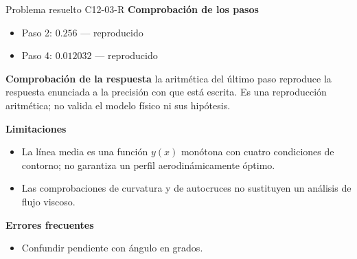 \documentclass[10pt,openany]{book}
\begin{document}
\begin{studiumworked}{Problema resuelto C12-03-R}
\noindent\textbf{Comprobación de los pasos}
\begin{itemize}
\item Paso 2: $0.256$ — reproducido
\item Paso 4: $0.012032$ — reproducido
\end{itemize}

\noindent\textbf{Comprobación de la respuesta} la aritmética del último paso reproduce la respuesta enunciada a la precisión con que está escrita. Es una reproducción aritmética; no valida el modelo físico ni sus hipótesis.

\noindent\textbf{Limitaciones}
\begin{itemize}
\item La línea media es una función $y(x)$ monótona con cuatro condiciones de contorno; no garantiza un perfil aerodinámicamente óptimo.
\item Las comprobaciones de curvatura y de autocruces no sustituyen un análisis de flujo viscoso.
\end{itemize}

\noindent\textbf{Errores frecuentes}
\begin{itemize}
\item Confundir pendiente con ángulo en grados.
\end{itemize}
\end{studiumworked}
\end{document}
